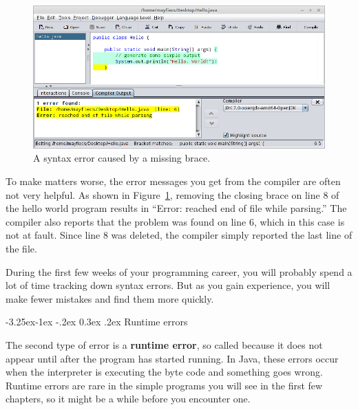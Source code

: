 \documentclass[12pt]{book}
\makeatletter
\renewcommand\subsection{\@startsection{subsection}{2}{\z@}%
    {-3.25ex\@plus -1ex \@minus -.2ex}%
    {0.3ex \@plus .2ex}%
    {\normalfont\large\bfseries}}
\theoremstyle{exercise}
\makeatother
\begin{document}
\begin{figure}[!h]
\begin{center}
\includegraphics[width=\textwidth]{figs/syntax-error.png}
\caption{A syntax error caused by a missing brace.}
\label{fig:syntax}
\end{center}
\end{figure}

To make matters worse, the error messages you get from the compiler are often not very helpful.
As shown in Figure~\ref{fig:syntax}, removing the closing brace on line 8 of the hello world program results in ``Error: reached end of file while parsing.''
The compiler also reports that the problem was found on line 6, which in this case is not at fault.
Since line 8 was deleted, the compiler simply reported the last line of the file.

During the first few weeks of your programming career, you will probably spend a lot of time tracking down syntax errors.
But as you gain experience, you will make fewer mistakes and find them more quickly.

\subsection{Runtime errors}


The second type of error is a {\bf runtime error}, so called because it does not appear until after the program has started running.
In Java, these errors occur when the interpreter is executing the byte code and something goes wrong.
Runtime errors are rare in the simple programs you will see in the first few chapters, so it might be a while before you encounter one.
\end{document}
